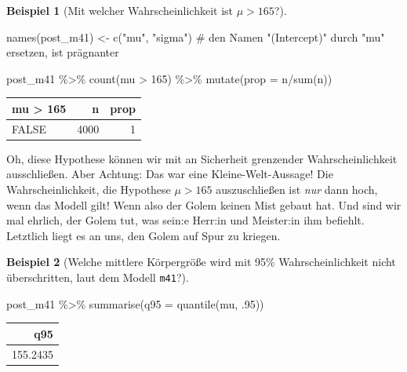 \documentclass[
  a4paper,
  DIV=11]{scrreprt}
\newenvironment{Shaded}{\begin{snugshade}}{\end{snugshade}}
\newcommand{\AttributeTok}[1]{\textcolor[rgb]{0.40,0.45,0.13}{#1}}
\newcommand{\CommentTok}[1]{\textcolor[rgb]{0.37,0.37,0.37}{#1}}
\newcommand{\DecValTok}[1]{\textcolor[rgb]{0.68,0.00,0.00}{#1}}
\newcommand{\FunctionTok}[1]{\textcolor[rgb]{0.28,0.35,0.67}{#1}}
\newcommand{\NormalTok}[1]{\textcolor[rgb]{0.00,0.23,0.31}{#1}}
\newcommand{\OtherTok}[1]{\textcolor[rgb]{0.00,0.23,0.31}{#1}}
\newcommand{\SpecialCharTok}[1]{\textcolor[rgb]{0.37,0.37,0.37}{#1}}
\newcommand{\StringTok}[1]{\textcolor[rgb]{0.13,0.47,0.30}{#1}}
\theoremstyle{definition}
\newtheorem{example}{Beispiel}[chapter]
\theoremstyle{remark}
\begin{document}
\leavevmode{}%
\begin{example}[Mit welcher Wahrscheinlichkeit ist
\(\mu>165\)?]\label{exm-kung2}

\begin{Shaded}
\begin{Highlighting}[]
\FunctionTok{names}\NormalTok{(post\_m41) }\OtherTok{\textless{}{-}} 
  \FunctionTok{c}\NormalTok{(}\StringTok{"mu"}\NormalTok{, }\StringTok{"sigma"}\NormalTok{)  }\CommentTok{\# den Namen "(Intercept)" durch "mu" ersetzen, ist prägnanter}

\NormalTok{post\_m41 }\SpecialCharTok{\%\textgreater{}\%} 
  \FunctionTok{count}\NormalTok{(mu }\SpecialCharTok{\textgreater{}} \DecValTok{165}\NormalTok{) }\SpecialCharTok{\%\textgreater{}\%} 
  \FunctionTok{mutate}\NormalTok{(}\AttributeTok{prop =}\NormalTok{ n}\SpecialCharTok{/}\FunctionTok{sum}\NormalTok{(n))}
\end{Highlighting}
\end{Shaded}

\begin{longtable}[]{@{}lrr@{}}
\toprule()
mu \textgreater{} 165 & n & prop \\
\midrule()
\endhead
FALSE & 4000 & 1 \\
\bottomrule()
\end{longtable}

Oh, diese Hypothese können wir mit an Sicherheit grenzender
Wahrscheinlichkeit ausschließen. Aber Achtung: Das war eine
Kleine-Welt-Aussage! Die Wahrscheinlichkeit, die Hypothese \(\mu > 165\)
auszuschließen ist \emph{nur} dann hoch, wenn das Modell gilt! Wenn also
der Golem keinen Mist gebaut hat. Und sind wir mal ehrlich, der Golem
tut, was sein:e Herr:in und Meister:in ihm befiehlt. Letztlich liegt es
an uns, den Golem auf Spur zu kriegen.

\end{example}

\leavevmode{}%
\begin{example}[Welche mittlere Körpergröße wird mit 95\%
Wahrscheinlichkeit nicht überschritten, laut dem Modell
\texttt{m41}?]\label{exm-kung3}

\begin{Shaded}
\begin{Highlighting}[]
\NormalTok{post\_m41 }\SpecialCharTok{\%\textgreater{}\%} 
  \FunctionTok{summarise}\NormalTok{(}\AttributeTok{q95 =} \FunctionTok{quantile}\NormalTok{(mu, .}\DecValTok{95}\NormalTok{))}
\end{Highlighting}
\end{Shaded}

\begin{longtable}[]{@{}r@{}}
\toprule()
q95 \\
\midrule()
\endhead
155.2435 \\
\bottomrule()
\end{longtable}

\end{example}
\end{document}
